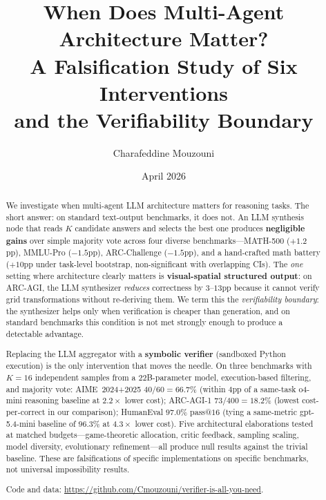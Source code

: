 \documentclass[11pt]{amsart}
\newcommand\1{{\mathds{1}}}
\theoremstyle{definition}
\theoremstyle{remark}
\numberwithin{equation}{section}
\begin{document}
\title[When Does Multi-Agent Architecture Matter?]
{When Does Multi-Agent Architecture Matter?\\[3pt]
A Falsification Study of Six Interventions\\[2pt]
and the Verifiability Boundary}

\author{Charafeddine Mouzouni}

\address{OPIT -- Open Institute of Technology, and Cohorte AI, Paris, France.}

\date{April 2026}

\begin{abstract}
We investigate when multi-agent LLM architecture matters for reasoning tasks.
The short answer: on standard text-output benchmarks, it does not.
An LLM synthesis node that reads $K$ candidate answers and selects the best one produces \textbf{negligible gains} over simple majority vote across four diverse benchmarks---MATH-500 ($+1.2$pp), MMLU-Pro ($-1.5$pp), ARC-Challenge ($-1.5$pp), and a hand-crafted math battery ($+10$pp under task-level bootstrap, non-significant with overlapping CIs).
The \emph{one} setting where architecture clearly matters is \textbf{visual-spatial structured output}: on ARC-AGI, the LLM synthesizer \emph{reduces} correctness by $3$--$13$pp because it cannot verify grid transformations without re-deriving them.
We term this the \emph{verifiability boundary}: the synthesizer helps only when verification is cheaper than generation, and on standard benchmarks this condition is not met strongly enough to produce a detectable advantage.

Replacing the LLM aggregator with a \textbf{symbolic verifier} (sandboxed Python execution) is the only intervention that moves the needle.
On three benchmarks with $K\!=\!16$ independent samples from a $22$B-parameter model, execution-based filtering, and majority vote:
AIME~2024+2025 $40/60 = 66.7\%$ (within $4$pp of a same-task o4-mini reasoning baseline at $2.2\times$ lower cost);
ARC-AGI-1 $73/400 = 18.2\%$ (lowest cost-per-correct in our comparison);
HumanEval $97.0\%$ pass@$16$ (tying a same-metric gpt-5.4-mini baseline of $96.3\%$ at $4.3\times$ lower cost).
Five architectural elaborations tested at matched budgets---game-theoretic allocation, critic feedback, sampling scaling, model diversity, evolutionary refinement---all produce null results against the trivial baseline.
These are falsifications of specific implementations on specific benchmarks, not universal impossibility results.

Code and data: \url{https://github.com/Cmouzouni/verifier-is-all-you-need}.
\end{abstract}
\end{document}
